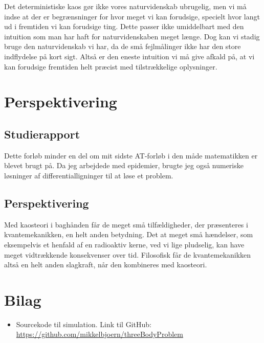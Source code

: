 \documentclass[12pt,a4paper]{article}
\theoremstyle{break}
\theoremstyle{nonumberplain}
\begin{document}
Det deterministiske kaos gør ikke vores naturvidenskab ubrugelig, men vi må indse at der er begrænsninger for hvor meget vi kan forudsige, specielt hvor langt ud i fremtiden vi kan forudsige ting. 
Dette passer ikke umiddelbart med den intuition som man har haft for naturvidenskaben meget længe. 
Dog kan vi stadig bruge den naturvidenskab vi har, da de små fejlmålinger ikke har den store indflydelse på kort sigt. 
Altså er den eneste intuition vi må give afkald på, at vi kan forudsige fremtiden helt præcist med tilstrækkelige oplysninger.

\section{Perspektivering}
\subsection{Studierapport}
Dette forløb minder en del om mit sidste AT-forløb i den måde matematikken er blevet brugt på. 
Da jeg arbejdede med epidemier, brugte jeg også numeriske løsninger af differentialligninger til at løse et problem. 

\subsection{Perspektivering}
Med kaosteori i baghånden får de meget små tilfældigheder, der præsenteres i kvantemekanikken, en helt anden betydning. 
Det at meget små hændelser, som eksempelvis et henfald af en radioaktiv kerne, ved vi lige pludselig, kan have meget vidtrækkende konsekvenser over tid. 
Filosofisk får de kvantemekanikken altså en helt anden slagkraft, når den kombineres med kaosteori.

\pagebreak

\section{Bilag}
\begin{itemize}
	\item Sourcekode til simulation. Link til GitHub:\\ \url{https://github.com/mikkelbjoern/threeBodyProblem}
\end{itemize}


\end{document}
